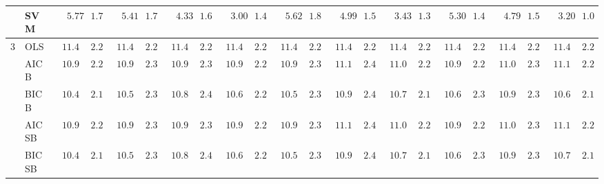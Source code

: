 \begin{tabular}{ll|ll|llllll|llllll|llllll}
 & SVM  & $\phantom{00}5.77$ & $\phantom{0}1.71$ & $\phantom{00}5.41$ & $\phantom{0}1.72$ & $\phantom{00}4.33$ & $\phantom{0}1.69$ & $\phantom{00}3.00$ & $\phantom{0}1.43$ & $\phantom{00}5.62$ & $\phantom{0}1.83$ & $\phantom{00}4.99$ & $\phantom{0}1.54$ & $\phantom{00}3.43$ & $\phantom{0}1.36$ & $\phantom{00}5.30$ & $\phantom{0}1.45$ & $\phantom{00}4.79$ & $\phantom{0}1.53$ & $\phantom{00}3.20$ & $\phantom{0}1.08$ \\\hline
3 & OLS  & $\phantom{0}11.48$ & $\phantom{0}2.26$ & $\phantom{0}11.48$ & $\phantom{0}2.26$ & $\phantom{0}11.48$ & $\phantom{0}2.26$ & $\phantom{0}11.48$ & $\phantom{0}2.26$ & $\phantom{0}11.48$ & $\phantom{0}2.26$ & $\phantom{0}11.48$ & $\phantom{0}2.26$ & $\phantom{0}11.48$ & $\phantom{0}2.26$ & $\phantom{0}11.48$ & $\phantom{0}2.26$ & $\phantom{0}11.48$ & $\phantom{0}2.26$ & $\phantom{0}11.48$ & $\phantom{0}2.26$ \\
 & AIC B  & $\phantom{0}10.96$ & $\phantom{0}2.24$ & $\phantom{0}10.99$ & $\phantom{0}2.37$ & $\phantom{0}10.96$ & $\phantom{0}2.30$ & $\phantom{0}10.96$ & $\phantom{0}2.27$ & $\phantom{0}10.91$ & $\phantom{0}2.30$ & $\phantom{0}11.16$ & $\phantom{0}2.49$ & $\phantom{0}11.09$ & $\phantom{0}2.28$ & $\phantom{0}10.97$ & $\phantom{0}2.25$ & $\phantom{0}11.05$ & $\phantom{0}2.39$ & $\phantom{0}11.10$ & $\phantom{0}2.29$ \\
 & BIC B  & $\phantom{0}10.47$ & $\phantom{0}2.19$ & $\phantom{0}10.56$ & $\phantom{0}2.33$ & $\phantom{0}10.81$ & $\phantom{0}2.45$ & $\phantom{0}10.68$ & $\phantom{0}2.26$ & $\phantom{0}10.59$ & $\phantom{0}2.36$ & $\phantom{0}10.95$ & $\phantom{0}2.43$ & $\phantom{0}10.76$ & $\phantom{0}2.19$ & $\phantom{0}10.62$ & $\phantom{0}2.30$ & $\phantom{0}10.92$ & $\phantom{0}2.39$ & $\phantom{0}10.69$ & $\phantom{0}2.15$ \\
 & AIC SB  & $\phantom{0}10.96$ & $\phantom{0}2.24$ & $\phantom{0}10.98$ & $\phantom{0}2.36$ & $\phantom{0}10.96$ & $\phantom{0}2.31$ & $\phantom{0}10.96$ & $\phantom{0}2.27$ & $\phantom{0}10.91$ & $\phantom{0}2.30$ & $\phantom{0}11.16$ & $\phantom{0}2.49$ & $\phantom{0}11.07$ & $\phantom{0}2.25$ & $\phantom{0}10.97$ & $\phantom{0}2.25$ & $\phantom{0}11.07$ & $\phantom{0}2.38$ & $\phantom{0}11.10$ & $\phantom{0}2.29$ \\
 & BIC SB  & $\phantom{0}10.47$ & $\phantom{0}2.19$ & $\phantom{0}10.56$ & $\phantom{0}2.33$ & $\phantom{0}10.81$ & $\phantom{0}2.45$ & $\phantom{0}10.68$ & $\phantom{0}2.26$ & $\phantom{0}10.59$ & $\phantom{0}2.36$ & $\phantom{0}10.92$ & $\phantom{0}2.42$ & $\phantom{0}10.76$ & $\phantom{0}2.19$ & $\phantom{0}10.62$ & $\phantom{0}2.30$ & $\phantom{0}10.92$ & $\phantom{0}2.39$ & $\phantom{0}10.70$ & $\phantom{0}2.17$ \\

\end{tabular}
